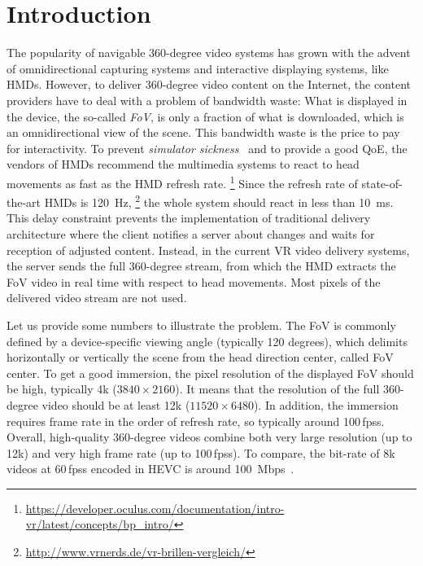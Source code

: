 \section{Introduction}
\label{sec:introduction}


The popularity of navigable 360-degree video systems
has grown with the advent of omnidirectional capturing systems
and interactive displaying
systems, like \acp{HMD}.
However, to deliver 360-degree video content on the Internet, the content providers
have to deal with a problem of bandwidth waste: What is displayed in the device,
the so-called \textit{\ac{FoV}}, is only a fraction of what is downloaded, which is an omnidirectional view of the scene.
This bandwidth waste is the price to pay for interactivity.
To prevent \emph{simulator sickness}~\cite{moss2011characteristics}
and to provide a good \ac{QoE}, the vendors of \acp{HMD} recommend the multimedia
systems to react
to head movements as fast as the \ac{HMD}
refresh rate.%
\footnote{\url{https://developer.oculus.com/documentation/intro-vr/latest/concepts/bp_intro/}}
Since the refresh rate of
state-of-the-art \acp{HMD} is \SI{120}{Hz},%
\footnote{\url{http://www.vrnerds.de/vr-brillen-vergleich/}}
the whole system should react in less than
\SI{10}{ms}. This delay constraint prevents the implementation of traditional delivery
architecture where the client notifies a server about changes and waits for reception
of adjusted content. Instead, in the current \ac{VR} video delivery systems, the server sends the 
full 360-degree stream, from which the \ac{HMD} 
extracts the \ac{FoV} video in real time with respect to head movements. Most pixels
of the delivered video stream are not used.

Let us provide some numbers to illustrate the problem.
The \ac{FoV} is commonly defined by
a device-specific viewing angle (typically 120 degrees), which delimits horizontally or
vertically the scene from the head direction center, called \ac{FoV} center. To get a good
immersion, the pixel
resolution of
the displayed \ac{FoV} should be high, typically 4k ($3840\times2160$). It means that
the resolution of the full 360-degree video should be at least 12k ($11520\times6480$).
In addition, the immersion requires frame rate in the order of refresh rate, so
typically around 100\,\acp{fps}.
Overall, high-quality 360-degree videos combine both very large resolution (up to 12k)
and very high frame rate (up to 100\,\acp{fps}). To compare, the bit-rate of 8k videos
at 60\,\acp{fps} encoded in \ac{HEVC} is around \SI{100}{Mbps}~\cite{7398367}.

